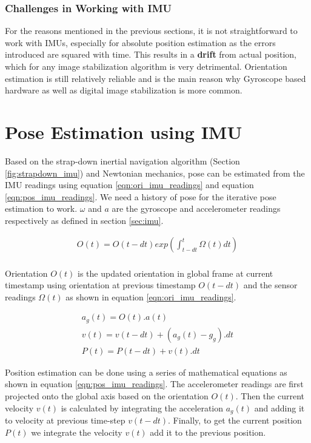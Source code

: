 \subsubsection{Challenges in Working with IMU}
For the reasons mentioned in the previous sections, it is not straightforward to work with IMUs, especially for absolute position estimation as the errors introduced are squared with time. This results in a \textbf{drift} from actual position, which for any image stabilization algorithm is very detrimental. Orientation estimation is still relatively reliable and is the main reason why Gyroscope based hardware as well as digital image stabilization is more common.

\section{Pose Estimation using IMU}
Based on the strap-down inertial navigation algorithm (Section \ref{fig:strapdown_imu}) and Newtonian mechanics, pose can be estimated from the IMU readings using equation \ref{eqn:ori_imu_readings} and equation \ref{eqn:pos_imu_readings}. We need a history of pose for the iterative pose estimation to work. $ \omega $ and $ a $ are the gyroscope and accelerometer readings respectively as defined in section \ref{sec:imu}.

\begin{equation}[H]
  \label{eqn:ori_imu_readings}
  \begin{aligned}
    O(t) = O(t - dt) exp(\int_{t-dt}^{t} \Omega(t) dt) \\
  \end{aligned}
\end{equation}

 Orientation $ O(t) $ is the updated orientation in global frame at current timestamp using orientation at previous timestamp $ O(t - dt) $  and the sensor readings $ \Omega(t) $ as shown in equation \ref{eqn:ori_imu_readings}.

\begin{equation}[H]
  \label{eqn:pos_imu_readings}
  \begin{gathered}
    a_g(t) = O(t).a(t) \\
    v(t) = v(t-dt) + (a_g(t) - g_g).dt \\
    P(t) = P(t-dt) + v(t).dt
  \end{gathered}
\end{equation}

 Position estimation can be done using a series of mathematical equations as shown in equation \ref{eqn:pos_imu_readings}. The accelerometer readings are first projected onto the global axis based on the orientation $ O(t) $. Then the current velocity $ v(t) $ is calculated by integrating the acceleration $ a_g(t) $ and adding it to velocity at previous time-step $ v(t-dt) $. Finally, to get the current position $ P(t) $ we integrate the velocity $ v(t) $ add it to the previous position. 

